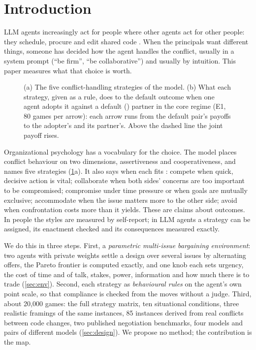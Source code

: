 \section{Introduction}
\label{sec:intro}

LLM agents increasingly act for people where other agents act for other people: they schedule, procure and edit shared code \citep{cooperbench,parallact}. When the principals want different things, someone has decided how the agent handles the conflict, usually in a system prompt (``be firm'', ``be collaborative'') and usually by intuition. This paper measures what that choice is worth.

\begin{figure}[t]
\centering
\FigOverview
\caption{(a) The five conflict-handling strategies of the \tki{} model. (b) What each strategy, given as a rule, does to the default outcome when one agent adopts it against a default (\neutral) partner in the core regime (E1, 80 games per arrow): each arrow runs from the default pair's payoffs to the adopter's and its partner's. Above the dashed line the joint payoff rises.}
\label{fig:overview}
\end{figure}

Organizational psychology has a vocabulary for the choice. The \tki{} model \citep{thomas1974tki,thomas1992conflict} places conflict behaviour on two dimensions, assertiveness and cooperativeness, and names five strategies (\cref{fig:overview}a). It also says when each fits \citep{thomas1977toward}: compete when quick, decisive action is vital; collaborate when both sides' concerns are too important to be compromised; compromise under time pressure or when goals are mutually exclusive; accommodate when the issue matters more to the other side; avoid when confrontation costs more than it yields. These are claims about outcomes. In people the styles are measured by self-report; in LLM agents a strategy can be assigned, its enactment checked and its consequences measured exactly.

We do this in three steps. First, a \emph{parametric multi-issue bargaining environment}: two agents with private weights settle a design over several issues by alternating offers, the Pareto frontier is computed exactly, and one knob each sets urgency, the cost of time and of talk, stakes, power, information and how much there is to trade (\cref{sec:env}). Second, each strategy as \emph{behavioural rules} on the agent's own point scale, so that compliance is checked from the moves without a judge. Third, about 20{,}000 games: the full strategy matrix, ten situational conditions, three realistic framings of the same instances, 85 instances derived from real conflicts between code changes, two published negotiation benchmarks, four models and pairs of different models (\cref{sec:design}). We propose no method; the contribution is the map.

